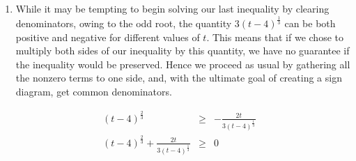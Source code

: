 \documentclass{ximera}
\begin{document}
\begin{example}
\begin{enumerate}
\begin{itemize}
\[\begin{array}{rclr}
       
\end{array}\]


\end{itemize}

Using either approach, we end up with the same, simpler, expression for $r(x)$ and we use that to create our sign diagram as shown below.


\begin{image}
% 
\end{image}


We find $r(x) \leq 0$ on $\left[\frac{3}{2},2\right) \cup (2, \infty)$.  To check, we graph $f(x)=3 (2-x)^{\frac{1}{3}}$  and $g(x) = x (2-x)^{-\frac{2}{3}}$ using desmos. We confirm that the graphs intersect at $x=\frac{3}{2}$ and the graph of $y = f(x) = 3 (2-x)^{\frac{1}{3}}$ is below the graph of $y = g(x) = x (2-x)^{-\frac{2}{3}}$ for $x > \frac{3}{2}$, with the exception of $x=2$ where it appears the graph of $g$ has a vertical asymptote. 



\begin{center}
\end{center}

\item While it may be tempting to begin solving  our last inequality by clearing denominators, owing to the odd root, the quantity $3(t-4)^{\frac{1}{3}}$ can be both positive and negative for different values of $t$.  This means that if we chose to multiply both sides of our inequality by this quantity, we have no guarantee if the inequality would be preserved.  Hence we proceed as usual by gathering all the nonzero terms to one side, and,  with the ultimate goal of creating a sign diagram, get common denominators.  

\[ \begin{array}{rclr}

(t-4)^{\frac{2}{3}} & \geq &  - \frac{2t}{3(t-4)^{\frac{1}{3}}} & \\


(t-4)^{\frac{2}{3}} + \frac{2t}{3(t-4)^{\frac{1}{3}}}  & \geq & 0 \\


\end{array}\]
\end{enumerate}
\end{example}
\end{document}
